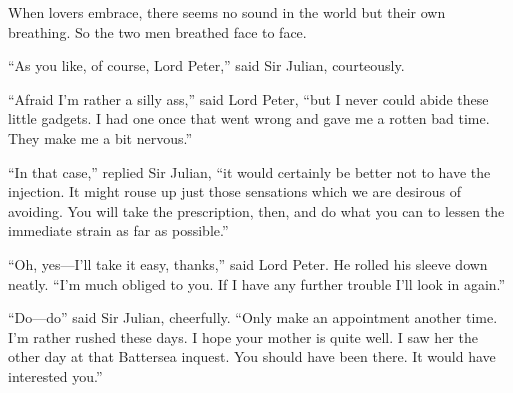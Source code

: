When lovers embrace, there seems no sound in the world but their own breathing. So the two men breathed face to face.

\enquote{As you like, of course, Lord Peter,} said Sir Julian, courteously.

\enquote{Afraid I’m rather a silly ass,} said Lord Peter, \enquote{but I never could abide these little gadgets. I had one once that went wrong and gave me a rotten bad time. They make me a bit nervous.}

\enquote{In that case,} replied Sir Julian, \enquote{it would certainly be better not to have the injection. It might rouse up just those sensations which we are desirous of avoiding. You will take the prescription, then, and do what you can to lessen the immediate strain as far as possible.}

\enquote{Oh, yes\allowbreak---\allowbreak I’ll take it easy, thanks,} said Lord Peter. He rolled his sleeve down neatly. \enquote{I’m much obliged to you. If I have any further trouble I’ll look in again.}

\enquote{Do\allowbreak---\allowbreak do\longdash} said Sir Julian, cheerfully. \enquote{Only make an appointment another time. I’m rather rushed these days. I hope your mother is quite well. I saw her the other day at that Battersea inquest. You should have been there. It would have interested you.}